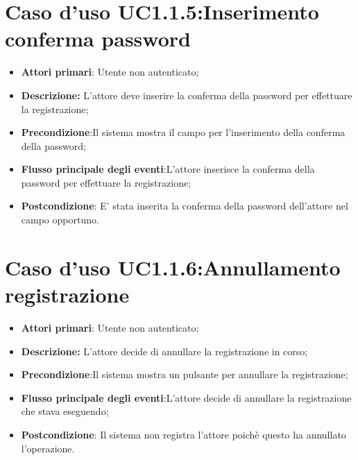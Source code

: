 \section{Caso d'uso UC1.1.5:Inserimento  conferma password}
\begin{itemize}
	\item \textbf{Attori primari}: Utente non autenticato;
	\item \textbf{Descrizione:} L'attore deve inserire la conferma della password per effettuare la registrazione;
	\item \textbf{Precondizione}:Il sistema mostra il campo per l'inserimento della conferma della password;
	\item \textbf{Flusso principale degli eventi}:L'attore inserisce la conferma della password per effettuare la registrazione;
	\item \textbf{Postcondizione}: E' stata inserita la conferma della password dell'attore nel campo opportuno.
\end{itemize}

\section{Caso d'uso UC1.1.6:Annullamento registrazione}
\begin{itemize}
	\item \textbf{Attori primari}: Utente non autenticato;
	\item \textbf{Descrizione:} L'attore decide di annullare la registrazione in corso;
	\item \textbf{Precondizione}:Il sistema mostra un pulsante per annullare la  registrazione;
	\item \textbf{Flusso principale degli eventi}:L'attore decide di annullare la registrazione che stava eseguendo;
	\item \textbf{Postcondizione}: Il sistema non registra l'attore poichè questo ha annullato l'operazione.
\end{itemize}

